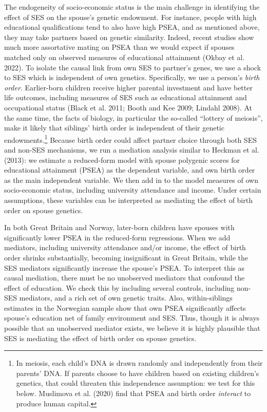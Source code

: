 \documentclass[
  12pt,
]{article}
\theoremstyle{definition}
\theoremstyle{definition}
\theoremstyle{definition}
\theoremstyle{definition}
\theoremstyle{remark}
\begin{document}
The endogeneity of socio-economic status is the main challenge in
identifying the effect of SES on the spouse's genetic endowment. For
instance, people with high educational qualifications tend to also have
high PSEA, and as mentioned above, they may take partners based on
genetic similarity. Indeed, recent studies show much more assortative
mating on PSEA than we would expect if spouses matched only on observed
measures of educational attainment ({Okbay et al.} 2022). To isolate the
causal link from own SES to partner's genes, we use a shock to SES which
is independent of own genetics. Specifically, we use a person's \emph{birth
order}. Earlier-born children receive higher parental investment and
have better life outcomes, including measures of SES such as educational
attainment and occupational status (Black et al. 2011; Booth and Kee 2009; Lindahl 2008). At the same time, the facts of biology, in particular
the so-called ``lottery of meiosis'', make it likely that siblings' birth
order is independent of their genetic endowments.\footnote{In meiosis, each child's DNA is drawn randomly and independently
  from their parents' DNA. If parents choose to have children based on
  existing children's genetics, that could threaten this independence
  assumption: we test for this below. Muslimova et al. (2020) find that
  PSEA and birth order \emph{interact} to produce human capital.} Because birth
order could affect partner choice through both SES and non-SES
mechanisms, we run a mediation analysis similar to
Heckman et al. (2013): we estimate a reduced-form model with spouse
polygenic scores for educational attainment (PSEA) as the dependent
variable, and own birth order as the main independent variable. We then
add in to the model measures of own socio-economic status, including
university attendance and income. Under certain assumptions, these
variables can be interpreted as mediating the effect of birth order on
spouse genetics.

In both Great Britain and Norway, later-born children have spouses with
significantly lower PSEA in the reduced-form regressions. When we add
mediators, including university attendance and/or income, the effect of
birth order shrinks substantially, becoming insignificant in Great
Britain, while the SES mediators significantly increase the spouse's
PSEA. To interpret this as causal mediation, there must be no unobserved
mediators that confound the effect of education. We check this by
including several controls, including non-SES mediators, and a rich set
of own genetic traits. Also, within-siblings estimates in the Norwegian
sample show that own PSEA significantly affects spouse's education net
of family environment and SES. Thus, though it is always possible that
an unobserved mediator exists, we believe it is highly plausible that
SES is mediating the effect of birth order on spouse genetics.
\end{document}
